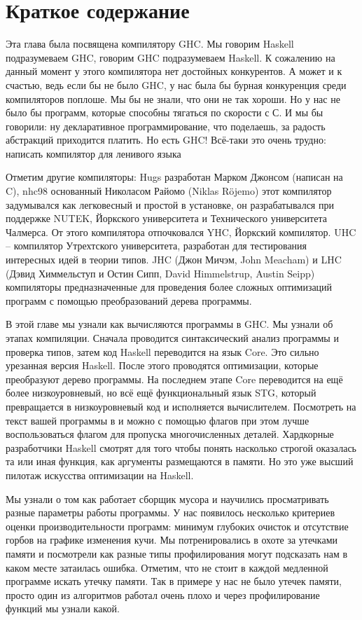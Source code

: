 \section{Краткое содержание}

Эта глава была посвящена компилятору GHC. Мы говорим Haskell
подразумеваем GHC, говорим GHC подразумеваем Haskell. К сожалению на
данный момент у этого компилятора нет достойных конкурентов. А может и к
счастью, ведь если бы не было GHC, у нас была бы бурная конкуренция
среди компиляторов поплоше. Мы бы не знали, что они не так хороши. Но у
нас не было бы программ, которые способны тягаться по скорости с С. И мы
бы говорили: ну декларативное программирование, что поделаешь, за
радость абстракций приходится платить. Но есть GHC! Всё-таки это очень
трудно: написать компилятор для ленивого языка

Отметим другие компиляторы: Hugs разработан Марком Джонсом (написан на
C), nhc98 основанный Николасом Райомо (Niklas Röjemo) этот компилятор
задумывался как легковесный и простой в установке, он разрабатывался при
поддержке NUTEK, Йоркского университета и Технического университета
Чалмерса. От этого компилятора отпочковался YHC, Йоркский компилятор.
UHC -- компилятор Утрехтского университета, разработан для тестирования
интересных идей в теории типов. JHC (Джон Мичэм, John Meacham) и LHC
(Дэвид Химмельступ и Остин Сипп, David Himmelstrup, Austin Seipp)
компиляторы предназначенные для проведения более сложных оптимизаций
программ с помощью преобразований дерева программы.

В этой главе мы узнали как вычисляются программы в GHC. Мы узнали об
этапах компиляции. Сначала проводится синтаксический анализ программы и
проверка типов, затем код Haskell переводится на язык Core. Это сильно
урезанная версия Haskell. После этого проводятся оптимизации, которые
преобразуют дерево программы. На последнем этапе Core переводится на ещё
более низкоуровневый, но всё ещё функциональный язык STG, который
превращается в низкоуровневый код и исполняется вычислителем. Посмотреть
на текст вашей программы в  и  можно с помощью флагов
  при этом лучше воспользоваться флагом
 для пропуска многочисленных деталей. Хардкорные
разработчики Haskell смотрят  для того чтобы понять насколько
строгой оказалась та или иная функция, как аргументы размещаются в
памяти. Но это уже высший пилотаж искусства оптимизации на Haskell.

Мы узнали о том как работает сборщик мусора и научились просматривать
разные параметры работы программы. У нас появилось несколько критериев
оценки производительности программ: минимум глубоких очисток и
отсутствие горбов на графике изменения кучи. Мы потренировались в охоте
за утечками памяти и посмотрели как разные типы профилирования могут
подсказать нам в каком месте затаилась ошибка. Отметим, что не стоит в
каждой медленной программе искать утечку памяти. Так в примере
 у нас не было утечек памяти, просто один из алгоритмов
работал очень плохо и через профилирование функций мы узнали какой.

